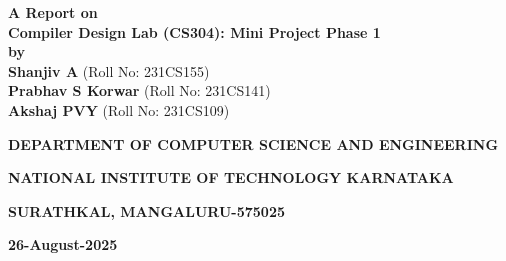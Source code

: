 \documentclass[12pt]{article}
\newlength{\defbaselineskip}
\newcommand{\setlinespacing}[1]{\setlength{\baselineskip}{#1 \defbaselineskip}}
\begin{document}
\begin{titlepage}
\setlinespacing{2}
\thispagestyle{empty}

\begin{center}
{\fontsize{22}{26.4}\textbf{A Report on\\ Compiler Design Lab (CS304): Mini Project Phase 1}}\\


\textbf{by}\\
{\textbf{Shanjiv A}} (Roll No: 231CS155)\\
\vspace{0.5cm}
{\textbf{Prabhav S Korwar}} (Roll No: 231CS141)\\
\vspace{0.5cm}
{\textbf{Akshaj PVY}} (Roll No: 231CS109)\\


\vspace{0.3cm}
\begin{figure}[h] 
{\par}
\end{figure} 

\setlinespacing{2}
\vspace{0.3cm}



{\textbf{DEPARTMENT OF COMPUTER SCIENCE AND ENGINEERING}\par}
\vspace{-12pt}
{\textbf{NATIONAL INSTITUTE OF TECHNOLOGY KARNATAKA}\par}
\vspace{-12pt}
{\textbf{SURATHKAL, MANGALURU-575025}\par}
\vspace{-12pt}
{\textbf{26-August-2025}\par}



\end{center}
\pagebreak
\end{titlepage}
\end{document}
